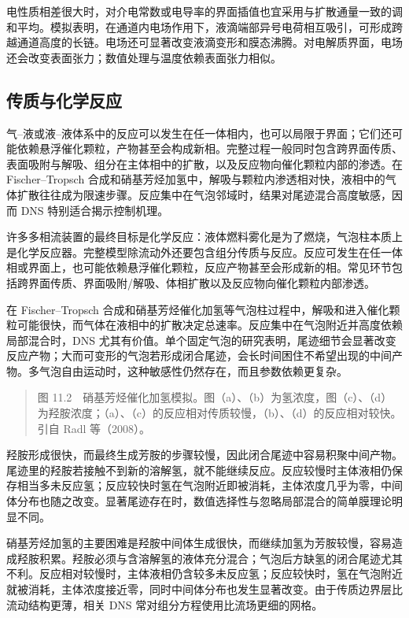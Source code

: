 \documentclass[11pt,a4paper,openany,fontset=none]{ctexbook}
\begin{document}
电性质相差很大时，对介电常数或电导率的界面插值也宜采用与扩散通量一致的调和平均。模拟表明，在通道内电场作用下，液滴端部异号电荷相互吸引，可形成跨越通道高度的长链。电场还可显著改变液滴变形和膜态沸腾。对电解质界面，电场还会改变表面张力；数值处理与温度依赖表面张力相似。

\subsection{传质与化学反应}
气--液或液--液体系中的反应可以发生在任一体相内，也可以局限于界面；它们还可能依赖悬浮催化颗粒，产物甚至会构成新相。完整过程一般同时包含跨界面传质、表面吸附与解吸、组分在主体相中的扩散，以及反应物向催化颗粒内部的渗透。在 Fischer--Tropsch 合成和硝基芳烃加氢中，解吸与颗粒内渗透相对快，液相中的气体扩散往往成为限速步骤。反应集中在气泡邻域时，结果对尾迹混合高度敏感，因而 DNS 特别适合揭示控制机理。


许多多相流装置的最终目标是化学反应：液体燃料雾化是为了燃烧，气泡柱本质上是化学反应器。完整模型除流动外还要包含组分传质与反应。反应可发生在任一体相或界面上，也可能依赖悬浮催化颗粒，反应产物甚至会形成新的相。常见环节包括跨界面传质、界面吸附/解吸、体相扩散以及反应物向催化颗粒内部渗透。

在 Fischer--Tropsch 合成和硝基芳烃催化加氢等气泡柱过程中，解吸和进入催化颗粒可能很快，而气体在液相中的扩散决定总速率。反应集中在气泡附近并高度依赖局部混合时，DNS 尤其有价值。单个固定气泡的研究表明，尾迹细节会显著改变反应产物；大而可变形的气泡若形成闭合尾迹，会长时间困住不希望出现的中间产物。多气泡自由运动时，这种敏感性仍然存在，而且参数依赖更复杂。

\begin{quote}\small 图 11.2　硝基芳烃催化加氢模拟。图（a）、（b）为氢浓度，图（c）、（d）为羟胺浓度；（a）、（c）的反应相对传质较慢，（b）、（d）的反应相对较快。引自 Radl 等（2008）。\end{quote}
羟胺形成很快，而最终生成芳胺的步骤较慢，因此闭合尾迹中容易积聚中间产物。尾迹里的羟胺若接触不到新的溶解氢，就不能继续反应。反应较慢时主体液相仍保存相当多未反应氢；反应较快时氢在气泡附近即被消耗，主体浓度几乎为零，中间体分布也随之改变。显著尾迹存在时，数值选择性与忽略局部混合的简单膜理论明显不同。

硝基芳烃加氢的主要困难是羟胺中间体生成很快，而继续加氢为芳胺较慢，容易造成羟胺积累。羟胺必须与含溶解氢的液体充分混合；气泡后方缺氢的闭合尾迹尤其不利。反应相对较慢时，主体液相仍含较多未反应氢；反应较快时，氢在气泡附近就被消耗，主体浓度接近零，同时中间体分布也发生显著改变。由于传质边界层比流动结构更薄，相关 DNS 常对组分方程使用比流场更细的网格。
\end{document}
